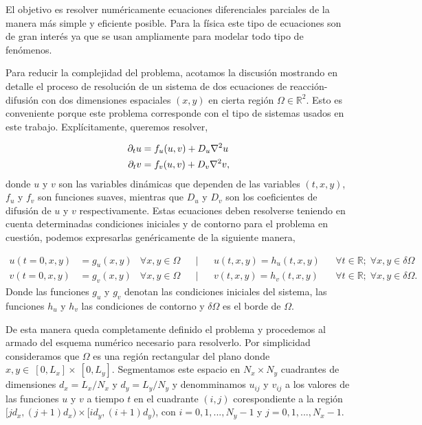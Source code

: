 El objetivo es resolver numéricamente ecuaciones diferenciales parciales de la manera más simple y eficiente posible. Para la física este tipo de ecuaciones son de gran 
interés ya que se usan ampliamente para modelar todo tipo de fenómenos. 

Para reducir la complejidad del problema, acotamos la discusión mostrando en detalle el proceso de resolución de un sistema de 
dos ecuaciones de reacción-difusión con dos dimensiones espaciales $(x,y)$ en cierta región $\Omega \in \mathbb{R}^2$. Esto es conveniente porque 
este problema corresponde con el tipo de sistemas usados en este trabajo. Explícitamente, queremos resolver,

\begin{equation}
\begin{split}
 \partial_t u & = f_u(u,v) + D_u \laplacian{u}\\
 \partial_t v & = f_v(u,v) + D_v \laplacian{v}, 
\label{eq:sist_rf}
\end{split}
\end{equation}
donde $u$ y $v$ son las variables dinámicas que dependen de las variables $(t,x,y)$, $f_u$ y $f_v$ son funciones suaves, mientras que $D_u$ y $D_v$ 
son los coeficientes de difusión de $u$ y $v$ respectivamente. Estas ecuaciones deben resolverse teniendo en cuenta determinadas condiciones iniciales y 
de contorno para el problema en cuestión, podemos expresarlas genéricamente de la siguiente manera,

\begin{align*}
u(t = 0,x,y) & = g_u(x,y) & \forall x,y \in \Omega &&|&& u(t,x,y) = h_u(t,x,y) && \forall t\in \mathbb{R};\; \forall x,y \in \delta \Omega\\
v(t = 0,x,y) & = g_v(x,y) & \forall x,y \in \Omega &&|&& v(t,x,y) = h_v(t,x,y) && \forall t\in \mathbb{R};\; \forall x,y \in \delta \Omega.
\label{eq:ic}
\end{align*}
Donde las funciones $g_u$ y $g_v$ denotan las condiciones iniciales del sistema, las funciones $h_u$ y $h_v$ las 
condiciones de contorno y $\delta \Omega$ es el borde de $\Omega$.

De esta manera queda completamente definido el problema y procedemos al armado del esquema numérico necesario para resolverlo. Por simplicidad consideramos que $\Omega$
es una región rectangular del plano donde $x,y \in~[0,L_x] \times~[0,L_y]$. Segmentamos este espacio en $N_x \times N_y$ cuadrantes de dimensiones $d_x = L_x/N_x$ y 
$d_y=L_y/N_y$ y denomminamos $u_{ij}$ y $v_{ij}$ a los valores de las funciones $u$ y $v$ a tiempo $t$ en el cuadrante $(i,j)$ corespondiente a la región 
$[jd_x,(j+1)d_x) \times [id_y,(i+1)d_y)$, con $i =0,1,...,N_y-1$ y $j = 0,1,...,N_x-1$.

